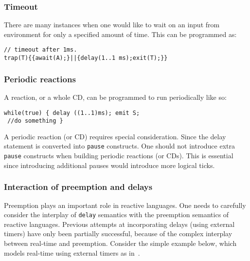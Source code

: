 
\subsubsection{Timeout}
\label{sec:timeout}

There are many instances when one would like to wait on an input from
environment for only a specified amount of time. This can be programmed
as:
\begin{verbatim}
// timeout after 1ms.
trap(T){{await(A);}||{delay(1..1 ms);exit(T);}}
\end{verbatim}

\subsubsection{Periodic reactions}
\label{sec:periodic-reactions}

A reaction, or a whole CD, can be programmed to run periodically like
so:

\begin{verbatim}
while(true) { delay ((1..1)ms); emit S; 
 //do something }
\end{verbatim}
A periodic reaction (or CD) requires special consideration. Since the
delay statement is converted into \texttt{pause} constructs. One should
not introduce extra \texttt{pause} constructs when building periodic
reactions (or CDs). This is essential since introducing additional
pauses would introduce more logical ticks.

\subsubsection{Interaction of preemption and delays}
\label{sec:inter-preempt-delays}

Preemption plays an important role in reactive languages. One needs to
carefully consider the interplay of \texttt{delay} semantics with the
preemption semantics of reactive languages. Previous attempts at
incorporating delays (using external timers) have only been partially
successful, because of the complex interplay between real-time and
preemption. Consider the simple example below, which models real-time
using external timers as in~\cite{rsh94}.

